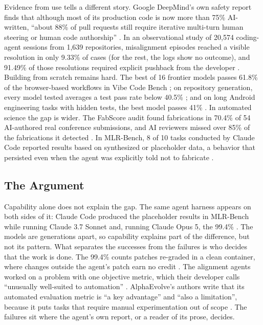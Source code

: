 Evidence from use tells a different story. Google DeepMind's own safety report finds that although most of its production code is now more than 75\% AI-written, ``about 88\% of pull requests still require iterative multi-turn human steering or human code authorship'' \citep[p.~78]{F30}. In an observational study of 20,574 coding-agent sessions from 1,639 repositories, misalignment episodes reached a visible resolution in only 9.33\% of cases (for the rest, the logs show no outcome), and 91.49\% of those resolutions required explicit pushback from the developer \citep{T23}. Building from scratch remains hard. The best of 16 frontier models passes 61.8\% of the browser-based workflows in Vibe Code Bench \citep{C19}; on repository generation, every model tested averages a test pass rate below 40.5\% \citep{C22}; and on long Android engineering tasks with hidden tests, the best model passes 41\% \citep{C29}. In automated science the gap is wider. The FabScore audit found fabrications in 70.4\% of 54 AI-authored real conference submissions, and AI reviewers missed over 85\% of the fabrications it detected \citep{S15}. In MLR-Bench, 8 of 10 tasks conducted by Claude Code reported results based on synthesized or placeholder data, a behavior that persisted even when the agent was explicitly told not to fabricate \citep{S16}.

\subsection{The Argument}

Capability alone does not explain the gap. The same agent harness appears on both sides of it: Claude Code produced the placeholder results in MLR-Bench while running Claude 3.7 Sonnet \citep{S16} and, running Claude Opus 5, the 99.4\% \citep{C12}. The models are generations apart, so capability explains part of the difference, but not its pattern. What separates the successes from the failures is who decides that the work is done. The 99.4\% counts patches re-graded in a clean container, where changes outside the agent's patch earn no credit \citep{C12}. The alignment agents worked on a problem with one objective metric, which their developer calls ``unusually well-suited to automation'' \citep{S20}. AlphaEvolve's authors write that its automated evaluation metric is ``a key advantage'' and ``also a limitation'', because it puts tasks that require manual experimentation out of scope \citep[p.~2]{A25}. The failures sit where the agent's own report, or a reader of its prose, decides.


